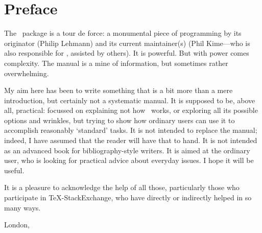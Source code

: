 
\maketitle

\tableofcontents

\chapter{Preface}

The \biblatex\ package is a tour de force: a monumental piece of
programming by its originator (Philip Lehmann) and its current
maintainer(s) (Phil Kime---who is also responsible for
, assisted by others). It is powerful. But with power
comes complexity. The manual is a mine of information, but sometimes
rather overwhelming.

My aim here has been to write something that is a bit more than a mere
introduction, but certainly not a systematic manual. It is supposed to
be, above all, practical: focussed on explaining not how \biblatex\
works, or exploring all its possible options and wrinkles, but trying
to show how ordinary users can use it to accomplish reasonably
`standard' tasks. It is not intended to replace the manual; indeed, I
have assumed that the reader will have that to hand. It is not
intended as an advanced book for bibliography-style writers. It is
aimed at the ordinary user, who is looking for practical advice about
everyday issues. I hope it will be useful.

It is a pleasure to acknowledge the help of all those, particularly
those who participate in \TeX-StackExchange, who have directly or
indirectly helped in so many ways.

\hfill{}

\hfill{London, \prefacedate}

